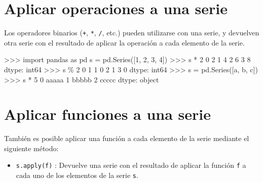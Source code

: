 \documentclass[
  spanish,
  a4paper,
]{scrreport}
\newenvironment{Shaded}{\begin{snugshade}}{\end{snugshade}}
\newcommand{\BuiltInTok}[1]{\textcolor[rgb]{0.00,0.23,0.31}{#1}}
\newcommand{\DecValTok}[1]{\textcolor[rgb]{0.68,0.00,0.00}{#1}}
\newcommand{\ImportTok}[1]{\textcolor[rgb]{0.00,0.46,0.62}{#1}}
\newcommand{\NormalTok}[1]{\textcolor[rgb]{0.00,0.23,0.31}{#1}}
\newcommand{\OperatorTok}[1]{\textcolor[rgb]{0.37,0.37,0.37}{#1}}
\newcommand{\StringTok}[1]{\textcolor[rgb]{0.13,0.47,0.30}{#1}}
\providecommand{\tightlist}{%
  \setlength{\itemsep}{0pt}\setlength{\parskip}{0pt}}
\begin{document}
\section{Aplicar operaciones a una
serie}\label{aplicar-operaciones-a-una-serie}

Los operadores binarios (\texttt{+}, \texttt{*}, \texttt{/}, etc.)
pueden utilizarse con una serie, y devuelven otra serie con el resultado
de aplicar la operación a cada elemento de la serie.

\begin{Shaded}
\begin{Highlighting}[]
\OperatorTok{\textgreater{}\textgreater{}\textgreater{}} \ImportTok{import}\NormalTok{ pandas }\ImportTok{as}\NormalTok{ pd}
\NormalTok{s }\OperatorTok{=}\NormalTok{ pd.Series([}\DecValTok{1}\NormalTok{, }\DecValTok{2}\NormalTok{, }\DecValTok{3}\NormalTok{, }\DecValTok{4}\NormalTok{])}
\OperatorTok{\textgreater{}\textgreater{}\textgreater{}}\NormalTok{ s }\OperatorTok{*} \DecValTok{2}
\DecValTok{0}    \DecValTok{2}
\DecValTok{1}    \DecValTok{4}
\DecValTok{2}    \DecValTok{6}
\DecValTok{3}    \DecValTok{8}
\NormalTok{dtype: int64}
\OperatorTok{\textgreater{}\textgreater{}\textgreater{}}\NormalTok{ s }\OperatorTok{\%} \DecValTok{2}
\DecValTok{0}    \DecValTok{1}
\DecValTok{1}    \DecValTok{0}
\DecValTok{2}    \DecValTok{1}
\DecValTok{3}    \DecValTok{0}
\NormalTok{dtype: int64}
\OperatorTok{\textgreater{}\textgreater{}\textgreater{}}\NormalTok{ s }\OperatorTok{=}\NormalTok{ pd.Series([}\StringTok{\textquotesingle{}a\textquotesingle{}}\NormalTok{, }\StringTok{\textquotesingle{}b\textquotesingle{}}\NormalTok{, }\StringTok{\textquotesingle{}c\textquotesingle{}}\NormalTok{])}
\OperatorTok{\textgreater{}\textgreater{}\textgreater{}}\NormalTok{ s }\OperatorTok{*} \DecValTok{5}
\DecValTok{0}\NormalTok{    aaaaa}
\DecValTok{1}\NormalTok{    bbbbb}
\DecValTok{2}\NormalTok{    ccccc}
\NormalTok{dtype: }\BuiltInTok{object}
\end{Highlighting}
\end{Shaded}

\section{Aplicar funciones a una
serie}\label{aplicar-funciones-a-una-serie}

También es posible aplicar una función a cada elemento de la serie
mediante el siguiente método:

\begin{itemize}
\tightlist
\item
  \texttt{s.apply(f)} : Devuelve una serie con el resultado de aplicar
  la función \texttt{f} a cada uno de los elementos de la serie
  \texttt{s}.
\end{itemize}
\end{document}
